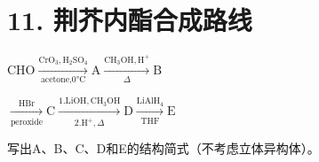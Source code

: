 \section*{11. 荆芥内酯合成路线}
$
\mathrm{CHO} \xrightarrow [ \text {acetone,0°C} ]{\mathrm{CrO} _ {3} , \mathrm{H} _ {2} \mathrm{SO} _ {4}} \mathrm{A} \xrightarrow [ \Delta ]{\mathrm{CH} _ {3} \mathrm{OH} , \mathrm{H} ^ {+}} \mathrm{B}
$

$
\xrightarrow [ \text {peroxide} ]{\mathrm{HBr}} \mathrm{C} \xrightarrow [ 2 . \mathrm{H} ^ {+} , \Delta ]{1 . \mathrm{LiOH} , \mathrm{CH} _ {3} \mathrm{OH}} \mathrm{D} \xrightarrow [ \mathrm{THF} ]{\mathrm{LiAlH} _ {4}} \mathrm{E}
$

写出A、B、C、D和E的结构简式（不考虑⽴体异构体）。
